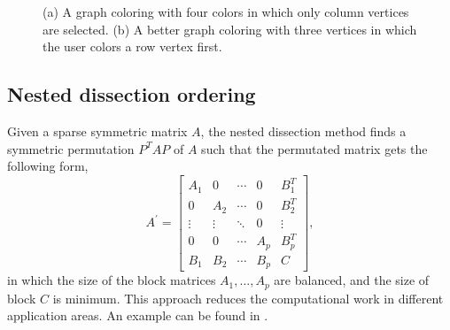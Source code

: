 \documentclass[12pt, twoside,a4paper,toc=bibliography]{scrbook}
\begin{document}
\begin{figure}
\centering
{}
\hfill
{}
\caption{
(a) A graph coloring with four colors in which only column vertices are selected.
(b) A better graph coloring with three vertices in which the user colors 
a row vertex first.}
\label{partial_coloring_good_coloring}
\end{figure}

\subsection{Nested dissection ordering}
Given a sparse symmetric matrix $A$, the nested dissection method finds a
symmetric permutation $P^T A P$ of $A$
such that the permutated matrix gets the following form,
$$
A^{\prime} =
\begin{bmatrix}
A_1 & 0   & \cdots & 0 & B_1^T \\
0   & A_2 & \cdots & 0  & B_2^T \\
\vdots& \vdots & \ddots & 0 & \vdots \\
0   &   0 & \cdots & A_p & B_p^T \\
B_1 & B_2 & \cdots & B_p& C
\end{bmatrix},
$$
in which the size of the block matrices $A_1,...,A_p$ are balanced,
and the size of block $C$ is minimum.
This approach reduces the computational work in different application areas.
An example can be found in \cite{2014:02}.
\end{document}
